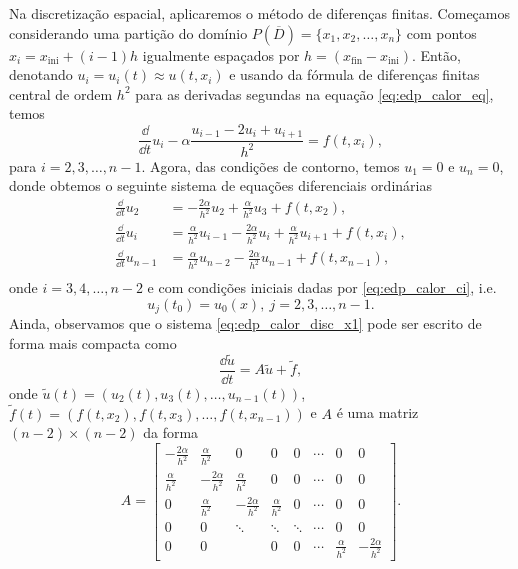 Na discretização espacial, aplicaremos o método de diferenças finitas. Começamos considerando uma partição do domínio $P(\overline{D}) = \{x_1, x_2, \dotsc, x_n\}$ com pontos $x_i = x_{\text{ini}}+(i-1)h$ igualmente espaçados por $h=(x_{\text{fin}}-x_{\text{ini}})$.  Então, denotando $u_{i}=u_{i}(t)\approx u(t,x_i)$ e usando da fórmula de diferenças finitas central de ordem $h^2$ para as derivadas segundas na equação \eqref{eq:edp_calor_eq}, temos
\begin{equation}
  \frac{\dd}{\dd t}u_{i} - \alpha\frac{u_{i-1}-2u_{i}+u_{i+1}}{h^2} = f(t,x_i),
\end{equation}
para $i=2, 3, \dotsc, n-1$. Agora, das condições de contorno, temos $u_1=0$ e $u_n=0$, donde obtemos o seguinte sistema de equações diferenciais ordinárias
\begin{align}\label{eq:edp_calor_disc_x1}
  \frac{\dd}{\dd t}u_2 &= -\frac{2\alpha}{h^2}u_{2} +\frac{\alpha}{h^2}u_{3} + f(t,x_2),\\
  \frac{\dd}{\dd t}u_i &= \frac{\alpha}{h^2}u_{i-1} - \frac{2\alpha}{h^2}u_{i} +\frac{\alpha}{h^2}u_{i+1} + f(t,x_i),\\
  \frac{\dd}{\dd t}u_{n-1} &= \frac{\alpha}{h^2}u_{n-2} - \frac{2\alpha}{h^2}u_{n-1}  + f(t,x_{n-1}),\\
\end{align}
onde $i=3, 4, \dotsc, n-2$ e com condições iniciais dadas por \eqref{eq:edp_calor_ci}, i.e.
\begin{equation}\label{eq:edp_calor_disc_x2}
  u_j(t_0) = u_0(x),~j=2, 3, \dotsc, n-1.
\end{equation}
Ainda, observamos que o sistema \eqref{eq:edp_calor_disc_x1} pode ser escrito de forma mais compacta como
\begin{equation}
  \frac{\dd \tilde{u}}{\dd t} = A\tilde{u} + \tilde{f},
\end{equation}
onde $\tilde{u}(t) = (u_2(t), u_3(t), \dotsc, u_{n-1}(t))$, $\tilde{f}(t) = (f(t,x_2), f(t,x_3), \dotsc, f(t,x_{n-1}))$ e $A$ é uma matriz $(n-2)\times (n-2)$ da forma
\begin{equation}\label{eq:edp_calor_disc_x3}
  A =
  \begin{bmatrix}
    -\frac{2\alpha}{h^2} & \frac{\alpha}{h^2} & 0 & 0 & 0 & \cdots & 0 & 0\\
    \frac{\alpha}{h^2} & -\frac{2\alpha}{h^2} & \frac{\alpha}{h^2} & 0 & 0 & \cdots & 0 & 0\\
    0 & \frac{\alpha}{h^2} & -\frac{2\alpha}{h^2} & \frac{\alpha}{h^2} & 0 & \cdots & 0 & 0\\
    0 & 0 & \ddots & \ddots & \ddots & \cdots & 0 & 0\\
    0 & 0 & & 0 & 0 & \cdots & \frac{\alpha}{h^2} & -\frac{2\alpha}{h^2}
  \end{bmatrix}.
\end{equation}


